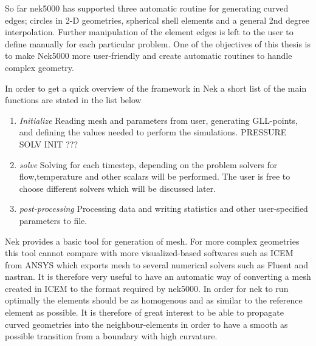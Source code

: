 So far nek5000 has supported three automatic routine for generating curved edges;
circles in 2-D geometries, spherical shell elements and a general 2nd degree interpolation.
Further manipulation of the element edges is left to the user to define manually
for each particular problem. One of the objectives of this thesis is to make Nek5000 more
user-friendly and create automatic routines to handle complex geometry.

In order to get a quick overview of the framework in Nek a short list of the main functions 
are stated in the list below 
%
\begin{enumerate}
    \item \emph{Initialize} 
    \subitem Reading mesh and parameters from user, generating GLL-points, and defining
        the values needed to perform the simulations. PRESSURE SOLV INIT ??? 
    \item \emph{solve}
     \subitem Solving for each timestep, depending on the problem solvers for flow,temperature 
     and other scalars will be performed. The user is free to choose different solvers which 
     will be discussed later.
 \item \emph{post-processing}
     \subitem Processing data and writing statistics and other user-specified parameters to file.
\end{enumerate}
%
Nek provides a basic tool for generation of mesh. For more complex geometries this tool cannot compare with more visualized-based softwares 
such as ICEM from ANSYS which exports mesh to several numerical solvers such as Fluent and nastran.
It is therefore very useful to have an automatic way of converting a mesh created in ICEM to the format required by nek5000. 
In order for nek to run optimally the elements should be as homogenous and as similar to the reference element as possible. 
It is therefore of great interest to be able to propagate curved geometries into the neighbour-elements in order to have a smooth as 
possible transition from a boundary with high curvature.

